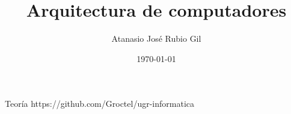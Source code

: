 \documentclass[10pt]{report}
\author{Atanasio José Rubio Gil}
\title{Arquitectura de computadores}
\date{\today}
\begin{document}
            {Teoría}
            {https://github.com/Groctel/ugr-informatica}
\tableofcontents


\end{document}
